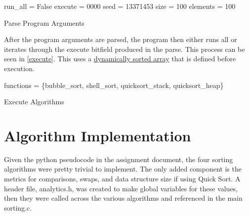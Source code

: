 \documentclass[12pt]{article}
\begin{document}
    \begin{algorithm}
        run\_all = False\;
		execute = 0000
        seed = 13371453
        size = 100
        elements = 100

        \caption{Parse Program Arguments}\label{parse}
    \end{algorithm}

    After the program arguments are parsed, the program then either runs all or iterates through the execute bitfield produced in the parse.
	This process can be seen in \vref{execute}. 
    This uses a \href{https://www.geeksforgeeks.org/dynamic-memory-allocation-in-c-using-malloc-calloc-free-and-realloc/}{dynamically sorted array} that is defined before execution.

    \begin{algorithm}
		functions = \{bubble\_sort, shell\_sort, quicksort\_stack, quicksort\_heap\}\;

        \caption{Execute Algorithms}\label{execute}
    \end{algorithm}

    \section{Algorithm Implementation}

	Given the python pseudocode in the assignment document, the four sorting algorithms were pretty trivial to implement.
	The only added component is the metrics for comparisons, swaps, and data structure size if using Quick Sort.
	A header file, analytics.h, was created to make global variables for these values,
	then they were called across the various algorithms and referenced in the main sorting.c.
\end{document}
